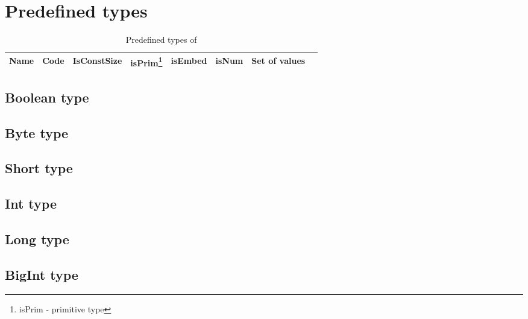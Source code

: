 \section{Predefined types}
\label{sec:appendix:predeftypes}

\begin{table}[h]
    \small
    \begin{tabu}{|l |l |l |l |l |l |l |l|}
     \hline
     \rowfont{\bfseries}
        Name   &   Code   &  IsConstSize & 
        isPrim\footnote{isPrim - primitive type} & 
        isEmbed  & isNum & Set of values \\
        \hline



    \hline
    \end{tabu}
    \caption{Predefined types of \langname}
    \label{table:predeftypes}
\end{table}


\subsection{Boolean type}
\label{sec:type:Boolean}


\subsection{Byte type}
\label{sec:type:Byte}


\subsection{Short type}
\label{sec:type:Short}


\subsection{Int type}
\label{sec:type:Int}


\subsection{Long type}
\label{sec:type:Long}


\subsection{BigInt type}
\label{sec:type:BigInt}


